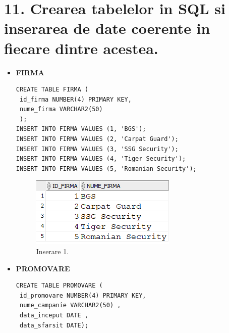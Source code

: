 
\section*{11. Crearea tabelelor in SQL si inserarea de date coerente in fiecare dintre acestea.}

\vspace{1cm}

\begin{itemize}

    \item \textbf{FIRMA}
    \vspace{0.2cm}
    \begin{lstlisting}
CREATE TABLE FIRMA (
 id_firma NUMBER(4) PRIMARY KEY,
 nume_firma VARCHAR2(50)
 );
INSERT INTO FIRMA VALUES (1, 'BGS');
INSERT INTO FIRMA VALUES (2, 'Carpat Guard');
INSERT INTO FIRMA VALUES (3, 'SSG Security');
INSERT INTO FIRMA VALUES (4, 'Tiger Security');
INSERT INTO FIRMA VALUES (5, 'Romanian Security');
    \end{lstlisting}
    \vspace{0.2cm}
    \begin{figure}[h]
      \centerline{\includegraphics{images/inserare1.png}}
      \caption{ Inserare 1.}
    \end{figure}
    \vspace{0.5cm}
    
    \item \textbf{PROMOVARE}
    \vspace{0.2cm}
    \begin{lstlisting}
CREATE TABLE PROMOVARE (
 id_promovare NUMBER(4) PRIMARY KEY,
 nume_campanie VARCHAR2(50) ,
 data_inceput DATE ,
 data_sfarsit DATE);


\end{lstlisting}
\end{itemize}
